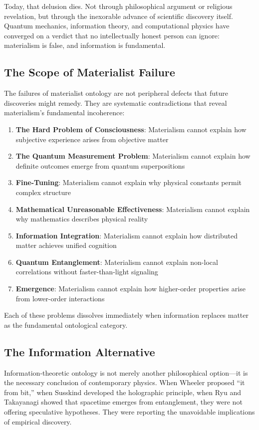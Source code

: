 \documentclass[12pt]{article}
\begin{document}
Today, that delusion dies. Not through philosophical argument or religious revelation, but through the inexorable advance of scientific discovery itself. Quantum mechanics, information theory, and computational physics have converged on a verdict that no intellectually honest person can ignore: materialism is false, and information is fundamental.

\subsection{The Scope of Materialist Failure}

The failures of materialist ontology are not peripheral defects that future discoveries might remedy. They are systematic contradictions that reveal materialism's fundamental incoherence:

\begin{enumerate}
\item \textbf{The Hard Problem of Consciousness}: Materialism cannot explain how subjective experience arises from objective matter
\item \textbf{The Quantum Measurement Problem}: Materialism cannot explain how definite outcomes emerge from quantum superpositions  
\item \textbf{Fine-Tuning}: Materialism cannot explain why physical constants permit complex structure
\item \textbf{Mathematical Unreasonable Effectiveness}: Materialism cannot explain why mathematics describes physical reality
\item \textbf{Information Integration}: Materialism cannot explain how distributed matter achieves unified cognition
\item \textbf{Quantum Entanglement}: Materialism cannot explain non-local correlations without faster-than-light signaling
\item \textbf{Emergence}: Materialism cannot explain how higher-order properties arise from lower-order interactions
\end{enumerate}

Each of these problems dissolves immediately when information replaces matter as the fundamental ontological category.

\subsection{The Information Alternative}

Information-theoretic ontology is not merely another philosophical option—it is the necessary conclusion of contemporary physics. When Wheeler proposed ``it from bit,'' when Susskind developed the holographic principle, when Ryu and Takayanagi showed that spacetime emerges from entanglement, they were not offering speculative hypotheses. They were reporting the unavoidable implications of empirical discovery.
\end{document}
